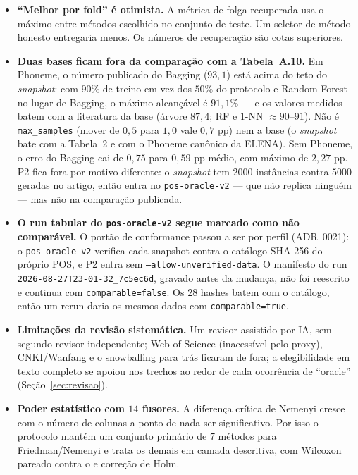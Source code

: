 \begin{itemize}
\item \textbf{``Melhor por fold'' é otimista.} A métrica de folga recuperada usa o
máximo entre métodos escolhido no conjunto de teste. Um seletor de método honesto
entregaria menos. Os números de recuperação são cotas superiores.

\item \textbf{Duas bases ficam fora da comparação com a Tabela~A.10.} Em Phoneme, o
número publicado do Bagging ($93{,}1$) está acima do teto do \emph{snapshot}: com
$90\%$ de treino em vez dos $50\%$ do protocolo e Random Forest no lugar de
Bagging, o máximo alcançável é $91{,}1\%$ --- e os valores medidos batem com a
literatura da base (árvore $87{,}4$; RF e $1$-NN $\approx90$--$91$). Não é
\texttt{max\_samples} (mover de $0{,}5$ para $1{,}0$ vale $0{,}7$ pp) nem a base
(o \emph{snapshot} bate com a Tabela~2 e com o Phoneme canônico da ELENA).
Sem Phoneme, o erro do Bagging cai de $0{,}75$ para $0{,}59$ pp médio, com máximo
de $2{,}27$ pp. P2 fica fora por motivo diferente: o \emph{snapshot} tem $2000$
instâncias contra $5000$ geradas no artigo, então entra no \texttt{pos-oracle-v2}
--- que não replica ninguém --- mas não na comparação publicada.

\item \textbf{O run tabular do \texttt{pos-oracle-v2} segue marcado como não
comparável.} O portão de conformance passou a ser por perfil (ADR~0021): o
\texttt{pos-oracle-v2} verifica cada snapshot contra o catálogo SHA-256 do
próprio POS, e P2 entra sem \texttt{--allow-unverified-data}. O manifesto do run
\texttt{2026-08-27T23-01-32\_\allowbreak 7c5ec6d}, gravado antes da mudança, não foi
reescrito e continua com \texttt{comparable=false}. Os $28$ hashes batem com o
catálogo, então um rerun daria os mesmos dados com \texttt{comparable=true}.

\item \textbf{Limitações da revisão sistemática.} Um revisor assistido por IA,
sem segundo revisor independente; Web of Science (inacessível pelo proxy),
CNKI/Wanfang e o snowballing para trás ficaram de fora; a elegibilidade em texto
completo se apoiou nos trechos ao redor de cada ocorrência de ``oracle''
(Seção~\ref{sec:revisao}).

\item \textbf{Poder estatístico com $14$ fusores.} A diferença crítica de Nemenyi
cresce com o número de colunas a ponto de nada ser significativo. Por isso o
protocolo mantém um conjunto primário de $7$ métodos para Friedman/Nemenyi e trata os
demais em camada descritiva, com Wilcoxon pareado contra o \mvr{} e correção de Holm.
\end{itemize}
